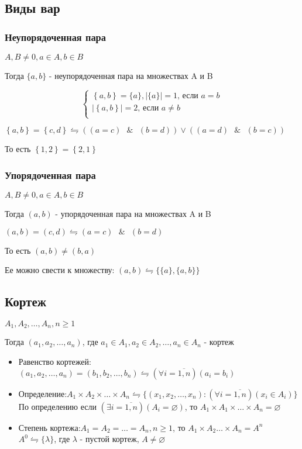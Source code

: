 \documentclass{report}
\newcommand{\band}{\mbox{ } \& \mbox{ }}
\begin{document}
\subsection{Виды вар}
\subsubsection{Неупорядоченная пара}
$A, B \neq 0, a \in A, b \in B$

Тогда $\{a,b\}$ - неупорядоченная пара на множествах A и B


$$
	\begin{cases}
		\left\{a,b\right\} = \{a\},|\{a\}| = 1 \mbox{, если $a = b$} \\
		|\left\{a,b\right\}| = 2 \mbox{, если $a \neq b$}            \\
	\end{cases}
$$

$\left\{a,b\right\} = \left\{c,d\right\} \leftrightharpoons ((a = c) \band (b = d)) \lor ((a = d) \band (b = c))$

То есть $\left\{1,2\right\} = \left\{2,1\right\}$

\subsubsection{Упорядоченная пара}
$A, B \neq 0, a \in A, b \in B$

Тогда $(a,b)$ - упорядоченная пара на множествах A и B

$(a,b) = (c,d) \leftrightharpoons (a = c) \band (b = d)$

То есть $(a,b) \neq (b,a)$


Ее можно свести к множеству: $(a,b) \leftrightharpoons \{\{a\}, \{a,b\}\}$

\subsection{Кортеж}
$A_1,A_2,\ldots,A_n, n \geq 1$

Тогда $(a_1,a_2,\ldots,a_n)$, где $a_1 \in A_1, a_2 \in A_2, \ldots, a_n \in A_n$ - кортеж

\begin{itemize}
	\item Равенство кортежей:\newline$(a_1,a_2,\ldots,a_n) = (b_1, b_2,\ldots,b_n) \leftrightharpoons (\forall i = \overline{1,n})(a_i = b_i)$
	\item Определение:\newline$A_1 \times A_2 \times \ldots \times A_n \leftrightharpoons \{(x_1, x_2, \ldots, x_n):(\forall i = \overline{1,n})(x_i \in A_i)\}$\newline
	      По определению если $(\exists i = \overline{1,n})(A_i = \varnothing)$, то $A_1 \times A_1 \times \ldots \times A_n = \varnothing$
	\item Степень кортежа: $A_1 = A_2 = \ldots = A_n, n \geq 1$, то $A_1 \times A_2 \ldots \times A_n = A^n$\newline
	      $A^0 \leftrightharpoons \{\lambda\}$, где $\lambda$ - пустой кортеж, $A \neq \varnothing$
\end{itemize}
\end{document}
